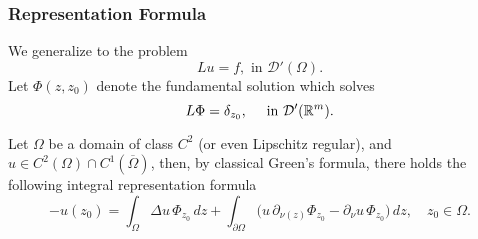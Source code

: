 \documentclass[handout]{beamer}
\newcommand{\upin}{\textup{ in }}
\begin{document}
\begin{frame}
 \frametitle{Representation Formula}
We generalize to the problem
\begin{equation}
Lu = f, \text{ in }\mathcal{D}'(\Omega).
\end{equation}
\pause
Let $\Phi(z,z_0)$ denote the {\color{blue}fundamental solution} which solves
\begin{equation}
\label{eq:fundamental-solution}
 L\Phi=\delta_{z_0},\quad\upin\mathcal{D}'(\mathbb{R}^m).
\end{equation}
\pause
\begin{theorem}
Let $\Omega$ be a domain of class $C^2$ (or even Lipschitz regular),
and $u \in C^2(\Omega)\cap C^1(\overline{\Omega})$,
then, by classical Green's formula,
there holds the following integral representation formula
\begin{equation}
  \label{eq:representation-formula}
  - u(z_0) = \int_\Omega\Delta u\,\Phi_{z_0}\,dz 
  + \int_{\partial \Omega}\big(u\, \partial_{\nu(z)} \Phi_{z_0}
  - \partial_\nu u\,\Phi_{z_0}\big)\,dz, \quad z_0 \in \Omega.
\end{equation}
\end{theorem}
\end{frame}
\end{document}
